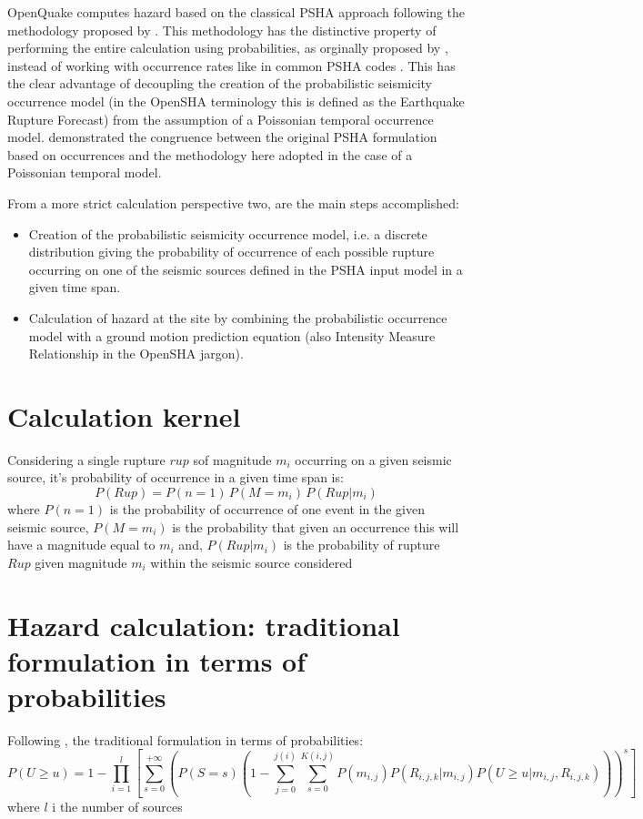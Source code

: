 OpenQuake computes hazard based on the classical PSHA approach 
\citep{cornell1968,mcguire2004} following the methodology proposed by 
\citet{field2003}. This methodology has the distinctive property of performing
the entire calculation using probabilities, as orginally proposed by 
\citet{chiang1984}, instead of working with occurrence rates like in common
PSHA codes \citep[see for instance][]{bender1987}. 
This has the clear advantage of decoupling the creation of the probabilistic 
seismicity occurrence model (in the OpenSHA terminology this is defined as the 
Earthquake Rupture Forecast) from the assumption of a Poissonian temporal 
occurrence model. \citet{field2003} demonstrated the congruence between the 
original PSHA formulation based on occurrences and the methodology here adopted 
in the case of a Poissonian temporal model. 

From a more strict calculation perspective two, are the main steps accomplished:
\begin{itemize}
\item Creation of the probabilistic seismicity occurrence model, i.e. a discrete 
distribution giving the probability of occurrence of each possible rupture 
occurring on one of the seismic sources defined in the PSHA input model in a  
given time span.  
\item Calculation of hazard at the site by combining the probabilistic 
occurrence model with a ground motion prediction equation (also Intensity 
Measure Relationship in the OpenSHA jargon).
\end{itemize}
%
\section{Calculation kernel}
Considering a single rupture $rup$ sof magnitude $m_i$ occurring on a given seismic 
source, it's probability of occurrence in a given time span is: 
\begin{equation}
P(Rup) = P(n=1)\,P(M=m_i)\,P(Rup|m_i)
\end{equation}
where $P(n=1)$ is the probability of occurrence of one event in the given seismic
source, $P(M=m_i)$ is the probability that given an occurrence this will have a 
magnitude equal to $m_i$ and, $P(Rup|m_i)$ is the probability of rupture $Rup$
given magnitude $m_i$ within the seismic source considered 
%
\section{Hazard calculation: traditional formulation in terms of probabilities}
Following \cite{field2003}, the traditional formulation in terms of probabilities:
%
\begin{equation}
P(U\geq u)= 
	1-\prod\limits_{i=1}^{l} 
	\left[\sum\limits_{s=0}^{+\infty}
	\left(P(S=s) 
	\left(
		1-\sum\limits_{j=0}^{j(i)}\sum\limits_{s=0}^{K(i,j)} 
		P(m_{i,j}) 
		P(R_{i,j,k}|m_{i,j}) P(U\geq u|m_{i,j},R_{i,j,k})
	\right)
	\right)^{s}
	\right] 
\end{equation}
where $l$ i the number of sources 

